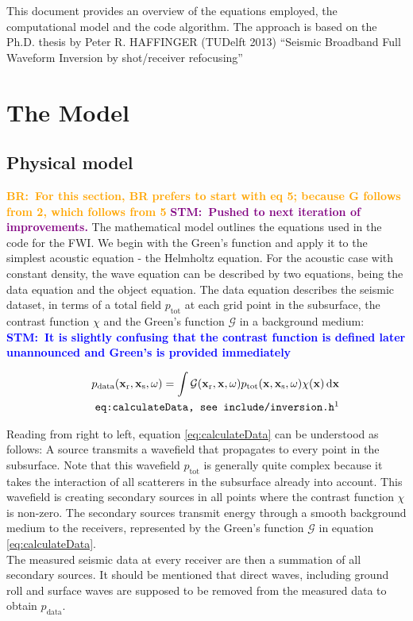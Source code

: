 \documentclass[10pt,a4paper]{article}
\newcommand{\df}[1]{\, \ensuremath{\mbox{d}#1}}
\newcommand{\commentstm}[1]{\textcolor{blue}{\textbf{STM:\ #1}}}
\newcommand{\commentstmtwo}[1]{\textcolor{purple}{\textbf{STM:\ #1}}}
\newcommand{\commentbr}[1]{\textcolor{orange}{\textbf{BR:\ #1}}}
\newcommand{\xs}{\mathbf{x}_\text{s}}
\newcommand{\xr}{\mathbf{x}_\text{r}}
\newcommand{\x}{\mathbf{x}}
\begin{document}
This document provides an overview of the
equations employed, the computational model and the code algorithm.
The approach is based on the Ph.D. thesis by Peter R. HAFFINGER (TUDelft 2013) ``Seismic Broadband Full Waveform Inversion
by shot/receiver refocusing''
\section{The Model}
\subsection{Physical model}
\commentbr{For this section, BR prefers to start with eq 5; because G
follows from 2, which follows from 5}
\commentstmtwo{Pushed to next iteration of improvements.}
The mathematical model outlines the equations used in the code for the FWI.
We begin with the Green's function and apply it to the
simplest acoustic equation - the Helmholtz equation.
For the acoustic case with constant density, the wave equation can be
described by two equations,
being the data equation and the object equation. The data equation
describes the seismic dataset, in terms of a total field
$p_{\text{tot}}$ at each grid point in the subsurface, the contrast
function $\chi$ and the Green's function $\mathcal{G}$
in a background medium: \commentstm{It is
slightly confusing that the contrast function is defined later
unannounced and Green's is provided immediately}

\begin{align}
\label{eq:calculateData}
p_\text{data}(\mathbf{x_\text{r}},\mathbf{x_\text{s}},\omega) = \int
\mathcal{G}(\xr, \x, \omega) p_\text{tot}(\x, \xs, \omega) \chi(\x)
\df{\x}\\
\tag*{\texttt{eq:calculateData, see include/inversion.h\footnotemark}}
\end{align}

Reading from right to left, equation \ref{eq:calculateData} can be understood as
follows: A source transmits a wavefield that propagates to every point
in the subsurface. Note that this wavefield $p_\text{tot}$ is
generally quite complex because it takes the interaction of all
scatterers in the subsurface already into account. This wavefield is
creating secondary sources in all points where the contrast function
$\chi$ is non-zero. The secondary sources transmit energy through a
smooth background medium to the receivers, represented by the Green's
function $\mathcal{G}$ in equation \ref{eq:calculateData}.\\ %
The measured seismic data at every receiver are then a summation of
all secondary sources. It should be mentioned that direct waves,
including ground roll and surface waves are supposed to be removed
from the measured data to obtain $p_\text{data}$.
\end{document}
